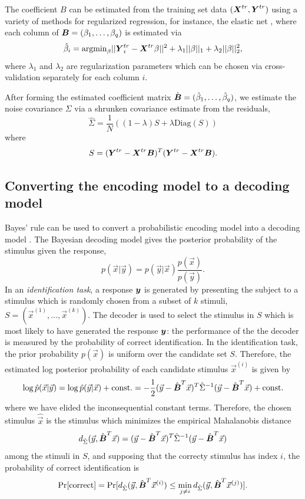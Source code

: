 \documentclass[12pt]{article}
\begin{document}
The coefficient $B$
can be estimated from the training set data $(\boldsymbol{X}^{tr}, \boldsymbol{Y}^{tr})$
using a variety of methods for regularized regression, for instance,
the elastic net \cite{Zou2005}, where each column of $\boldsymbol{B} =
(\beta_1,\hdots, \beta_q)$ is estimated via
\[
\hat{\beta}_i = \text{argmin}_\beta ||\boldsymbol{Y}_i^{tr} - \boldsymbol{X}^{tr} \beta||^2 + \lambda_1 ||\beta||_1 + \lambda_2 ||\beta||_2^2,
\]
where $\lambda_1$ and $\lambda_2$ are regularization parameters which
can be chosen via cross-validation \cite{Hastie2009a} separately for
each column $i$.

After forming the estimated coefficient matrix $\hat{\boldsymbol{B}} =
(\hat{\beta}_1,\hdots, \hat{\beta}_q)$, we estimate the noise
covariance $\Sigma$ via a shrunken covariance
estimate\cite{Ledoit2004}\cite{Daniels2001} from the residuals,
\[
\hat{\Sigma} = \frac{1}{N} ((1-\lambda) S + \lambda \text{Diag}(S)) 
\]
where
\[
S = (\boldsymbol{Y}^{tr} - \boldsymbol{X}^{tr} \boldsymbol{B})^T (\boldsymbol{Y}^{tr} - \boldsymbol{X}^{tr} \boldsymbol{B}).
\]

\subsection{Converting the encoding model to a decoding model}

Bayes' rule can be used to convert a probabilistic encoding model into a decoding model \cite{Naselaris2011}.
The Bayesian decoding model gives the posterior probability of the stimulus given the response,
\[
p(\vec{x}|\vec{y}) = p(\vec{y}|\vec{x})\frac{p(\vec{x})}{p(\vec{y})}.
\]
In an \emph{identification task}\cite{Kay2008a}, a response $\boldsymbol{y}$ is generated by presenting the subject to a stimulus which is randomly chosen from a 
subset of $k$ stimuli, $S = (\vec{x}^{(1)},\hdots, \vec{x}^{(k)})$.  The decoder is used to select the stimulus in $S$ which is most likely to have generated the response $\boldsymbol{y}$: the performance of the the decoder is measured by the probability of correct identification.
In the identification task, the prior probability $p(\vec{x})$ is uniform over the candidate set $S.$  Therefore, the estimated log posterior probability of each candidate stimulus $\vec{x}^{(i)}$ is given by
\[
\log \hat{p}(\vec{x}|\vec{y}) = \log \hat{p}(\vec{y}|\vec{x}) + \text{const.}= -\frac{1}{2}(\vec{y} - \hat{\boldsymbol{B}}^T \vec{x})^T \hat{\Sigma}^{-1} (\vec{y}-\hat{\boldsymbol{B}}^T \vec{x}) + \text{const.}
\]
where we have elided the inconsequential constant terms.
Therefore, the chosen stimulus $\hat{\vec{x}}$ is the stimulus which minimizes the empirical Mahalanobis distance 
\[
d_{\hat{\Sigma}}(\vec{y}, \hat{\boldsymbol{B}}^T \vec{x}) = (\vec{y} - \hat{\boldsymbol{B}}^T \vec{x})^T \hat{\Sigma}^{-1} (\vec{y}-\hat{\boldsymbol{B}}^T \vec{x})
\]
among the stimuli in $S$,
and supposing that the correcty stimulus has index $i$, the probability of correct identification is
\[
\Pr[\text{correct}] = \Pr[d_{\hat{\Sigma}}(\vec{y}, \hat{\boldsymbol{B}}^T \vec{x}^{(i)}) \leq \min_{j \neq i} d_{\hat{\Sigma}}(\vec{y}, \hat{\boldsymbol{B}}^T \vec{x}^{(j)}) ].
\]
\end{document}

